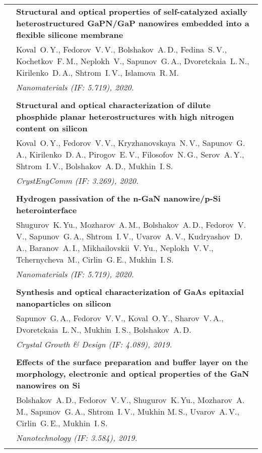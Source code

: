 \documentclass[letterpaper, 11pt]{article}
\begin{document}
\begin{longtable}{p{1.3in}p{4.8in}}
        & \textbf{Structural and optical properties of self-catalyzed axially
        heterostructured GaPN/GaP nanowires embedded into a flexible silicone
        membrane} \\
        & Koval~O.\,Y., Fedorov~V.\,V., Bolshakov~A.\,D., Fedina~S.\,V.,
        Kochetkov~F.\,M., Neplokh~V., Sapunov~G.\,A., Dvoretckaia~L.\,N.,
        Kirilenko~D.\,A., Shtrom~I.\,V., Islamova~R.\,M. \\
        & \textit{Nanomaterials (IF: 5.719), 2020.}\\
		& \\
		
        & \textbf{Structural and optical characterization of dilute phosphide
        planar heterostructures with high nitrogen content on silicon} \\
        & Koval~O.\,Y., Fedorov~V.\,V., Kryzhanovskaya~N.\,V., Sapunov~G.\,A.,
        Kirilenko~D.\,A., Pirogov~E.\,V., Filosofov~N.\,G., Serov~A.\,Y.,
        Shtrom~I.\,V., Bolshakov~A.\,D., Mukhin~I.\,S. \\
        & \textit{CrystEngComm (IF: 3.269), 2020.}\\
		& \\
		
        & \textbf{Hydrogen passivation of the n-GaN nanowire/p-Si
        heterointerface} \\
        & Shugurov~K.\,Yu., Mozharov~A.\,M., Bolshakov~A.\,D., Fedorov~V.\,V.,
        Sapunov~G.\,A., Shtrom~I.\,V., Uvarov~A.\,V., Kudryashov~D.\,A.,
        Baranov~A.\,I., Mikhailovskii~V.\,Yu., Neplokh~V.\,V., Tchernycheva~M.,
        Cirlin~G.\,E., Mukhin~I.\,S. \\
        & \textit{Nanomaterials (IF: 5.719), 2020.}\\
		& \\
		
        & \textbf{Synthesis and optical characterization of GaAs epitaxial
        nanoparticles on silicon} \\
        & Sapunov~G.\,A., Fedorov~V.\,V., Koval~O.\,Y., Sharov~V.\,A.,
        Dvoretckaia~L.\,N., Mukhin~I.\,S., Bolshakov~A.\,D. \\
        & \textit{Crystal Growth \& Design (IF: 4.089), 2019.}\\
		& \\
		
        & \textbf{Effects of the surface preparation and buffer layer on the
        morphology, electronic and optical properties of the GaN nanowires on
        Si} \\
        & Bolshakov~A.\,D., Fedorov~V.\,V., Shugurov~K.\,Yu., Mozharov~A.\,M.,
        Sapunov~G.\,A., Shtrom~I.\,V., Mukhin M.\,S., Uvarov~A.\,V.,
        Cirlin~G.\,E., Mukhin~I.\,S. \\
        & \textit{Nanotechnology (IF: 3.584), 2019.}\\
		& \\
		

\end{longtable}
\end{document}
